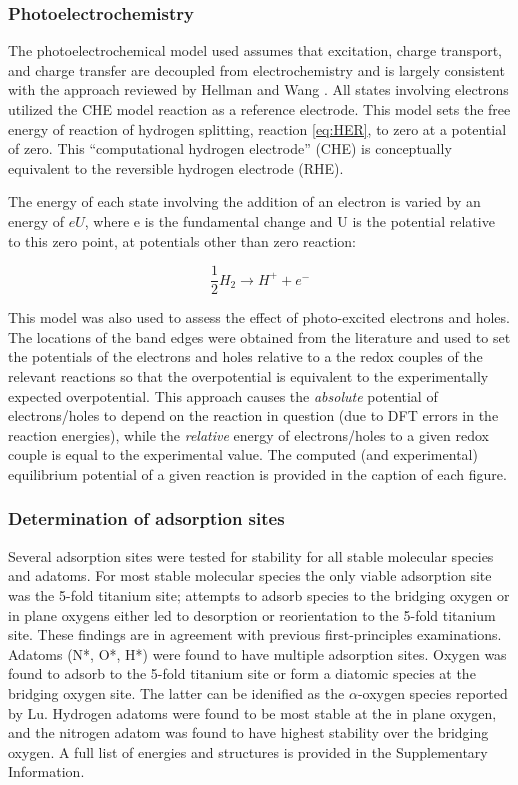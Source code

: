 \documentclass[journal=ascecg,manuscript=article,articletitle=true]{achemso}
\begin{document}
\subsubsection{Photoelectrochemistry}
The photoelectrochemical model used assumes that excitation, charge transport, and charge transfer are decoupled from electrochemistry and is largely consistent with the approach reviewed by Hellman and Wang \cite{Hellman2017}. All states involving electrons utilized the CHE model reaction as a reference electrode. This model sets the free energy of reaction of hydrogen splitting, reaction \ref{eq:HER}, to zero at a potential of zero. This ``computational hydrogen electrode'' (CHE) is conceptually equivalent to the reversible hydrogen electrode (RHE)\cite{Peterson_2010}.

The energy of each state involving the addition of an electron is varied by an energy of $eU$, where e is the fundamental change and U is the potential relative to this zero point, at potentials other than zero reaction:

\begin{equation}
	\label{eq:HER}
	\frac{1}{2}H_2\rightarrow H^{+}+e^{-}
\end{equation}

This model was also used to assess the effect of photo-excited electrons and holes. The locations of the band edges were obtained from the literature \cite{Nozik_1996} and used to set the potentials of the electrons and holes relative to a the redox couples of the relevant reactions so that the overpotential is equivalent to the experimentally expected overpotential. This approach causes the \textit{absolute} potential of electrons/holes to depend on the reaction in question (due to DFT errors in the reaction energies), while the \textit{relative} energy of electrons/holes to a given redox couple is equal to the experimental value. The computed (and experimental) equilibrium potential of a given reaction is provided in the caption of each figure.

\subsubsection{Determination of adsorption sites}

Several adsorption sites were tested for stability for all stable molecular species and adatoms. For most stable molecular species the only viable adsorption site was the 5-fold titanium site; attempts to adsorb species to the bridging oxygen or in plane oxygens either led to desorption or reorientation to the 5-fold titanium site. These findings are in agreement with previous first-principles examinations.\cite{Sorescu2000,Stodt2013} Adatoms (N*, O*, H*) were found to have multiple adsorption sites. Oxygen was found to adsorb to the 5-fold titanium site or form a diatomic species at the bridging oxygen site. The latter can be idenified as the $\alpha$-oxygen species reported by Lu.\cite{Lu1994} Hydrogen adatoms were found to be most stable at the in plane oxygen, and the nitrogen adatom was found to have highest stability over the bridging oxygen. A full list of energies and structures is provided in the Supplementary Information.
\end{document}
